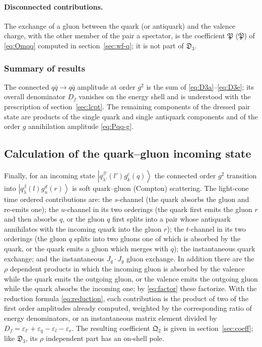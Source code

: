 \documentclass[11pt,a4paper]{article}
\numberwithin{equation}{section}
\newcommand{\mf}[1]{\mathfrak{#1}}
\newcommand{\eps}{\varepsilon}
\newcommand{\ket}[1]{\left|#1\right\rangle}
\newcommand{\qk}[3]{q^{#1}_{#2}(#3)}
\newcommand{\gl}[3]{g^{#1}_{#2}(#3)}
\begin{document}
\paragraph{Disconnected contributions.} The exchange of a gluon between the quark (or antiquark)
and the valence charge, with the other member of the pair a spectator, is the coefficient
$\mf P$ ($\bar{\mf P}$) of \eqref{eq:Omqq} computed in section~\ref{sec:wf-q}; it is not part of
$\mf D_{3}$.

\subsubsection{Summary of results}
\label{sec:sum-qq}

The connected $q\bar q\to q\bar q$ amplitude at order $g^{2}$ is the sum of \eqref{eq:D3a}--\eqref{eq:D3e};
its overall denominator $D_{f}$ vanishes on the energy shell and is understood with the
prescription of section~\ref{sec:lcpt}. The remaining components of the dressed pair state are
products of the single quark and single antiquark components and of the order $g$ annihilation
amplitude \eqref{eq:Pqq-g}.

\subsection{Calculation of the quark--gluon incoming state}
\label{sec:wf-qg}

Finally, for an incoming state $\ket{\qk{\beta'}{\lambda'}{l'}\gl{c}{k}{q}}$ the connected order
$g^{2}$ transition into $\ket{\qk{\beta}{\lambda}{l}\gl{d}{n}{r}}$ is soft quark--gluon (Compton)
scattering. The light-cone time ordered contributions are: the $s$-channel (the quark absorbs
the gluon and re-emits one); the $u$-channel in its two orderings (the quark first emits the
gluon $r$ and then absorbs $q$, or the gluon $q$ first splits into a pair whose antiquark
annihilates with the incoming quark into the gluon $r$); the $t$-channel in its two orderings (the
gluon $q$ splits into two gluons one of which is absorbed by the quark, or the quark emits a gluon
which merges with $q$); the instantaneous quark exchange; and the instantaneous $J_{q}\cdot J_{g}$
gluon exchange. In addition there are the $\rho$ dependent products in which the incoming gluon is
absorbed by the valence while the quark emits the outgoing gluon, or the valence emits the outgoing
gluon while the quark absorbs the incoming one; by \eqref{eq:factor} these factorize. With the
reduction formula \eqref{eq:reduction}, each contribution is the product of two of the first order
amplitudes already computed, weighted by the corresponding ratio of energy denominators, or an
instantaneous matrix element divided by $D_{f}=\eps_{l'}+\eps_{q}-\eps_{l}-\eps_{r}$. The resulting
coefficient $\mf Q_{2}$ is given in section~\ref{sec:coeff}; like $\mf D_{3}$, its $\rho$
independent part has an on-shell pole.
\end{document}
